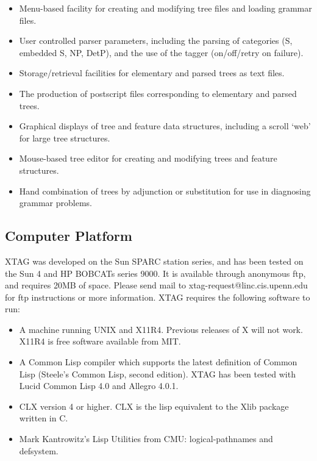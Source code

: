 \begin{itemize}

\item Menu-based facility for creating and modifying tree files and 
loading grammar files.

\item User controlled parser parameters, including the parsing of
categories (S, embedded S, NP, DetP), and the use of the tagger (on/off/retry
on failure).

\item Storage/retrieval facilities for elementary and parsed trees as
text files.

\item The production of postscript files corresponding to elementary
and parsed trees.

\item Graphical displays of tree and feature data structures,
including a scroll `web' for large tree structures.

\item Mouse-based tree editor for creating and modifying trees and
feature structures.

\item Hand combination of trees by adjunction or substitution for use
in diagnosing grammar problems.

\end{itemize}


\subsection{Computer Platform}

XTAG was developed on the Sun SPARC station series, and has been tested on the
Sun 4 and HP BOBCATs series 9000.  It is available through anonymous ftp, and
requires 20MB of space.  Please send mail to xtag-request@linc.cis.upenn.edu
for ftp instructions or more information.  XTAG requires the following software
to run:

\begin{itemize}

\item A machine running UNIX and X11R4. Previous releases of X will
not work.  X11R4 is free software available from MIT.

\item A Common Lisp compiler which supports the latest definition of Common 
Lisp (Steele's Common Lisp, second edition).  XTAG has been tested with Lucid
Common Lisp 4.0 and Allegro 4.0.1.


\item CLX version 4 or higher. CLX is the lisp equivalent to the Xlib package 
written in C.

\item Mark Kantrowitz's Lisp Utilities from CMU: logical-pathnames and
defsystem.

\end{itemize}

